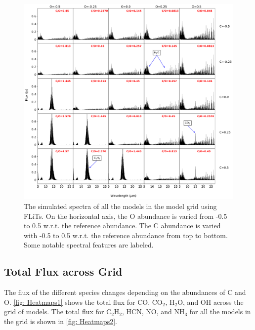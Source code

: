 \documentclass[twoside, single, authoryear, semicolon, 12pt]{lion-msc}
\newcommand{\4}{$_4$}
\newcommand{\3}{$_3$}
\newcommand{\2}{$_2$}
\begin{document}
\begin{figure}[H]
    \centering
    \includegraphics[width=\linewidth]{Figures/All_spectra.pdf}
    \caption{The simulated spectra of all the models in the model grid using FLiTs. On the horizontal axis, the O abundance is varied from -0.5 to 0.5 w.r.t. the reference abundance. The C abundance is varied with -0.5 to 0.5 w.r.t. the reference abundance from top to bottom. Some notable spectral features are labeled.}
    \label{fig: all spectra}
\end{figure}
\subsection{Total Flux across Grid}
The flux of the different species changes depending on the abundances of C and O. \autoref{fig: Heatmaps1} shows the total flux for CO, CO\2, H\2O, and OH across the grid of models. The total flux for C\2H\2, HCN, NO, and NH\3 for all the models in the grid is shown in \autoref{fig: Heatmaps2}. 
\end{document}

